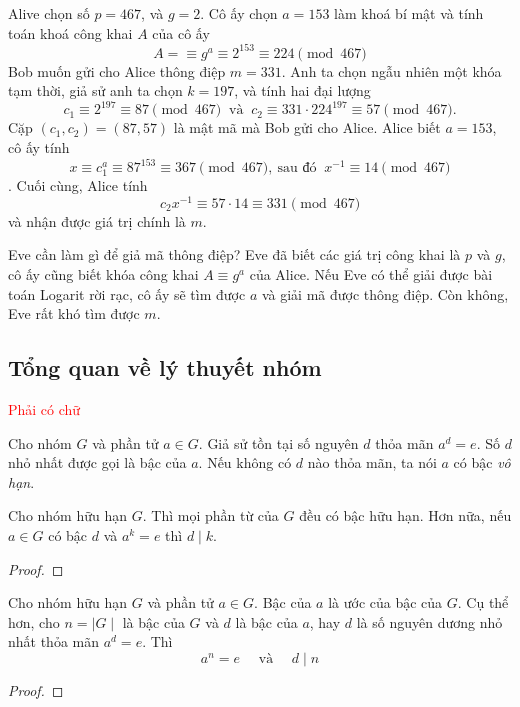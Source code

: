 \begin{example}
	Alive chọn số $p =467$, và $g = 2$. Cô ấy chọn $a = 153$ làm khoá bí mật và tính toán khoá công khai $A$ của cô ấy
	$$ A = \equiv g^a \equiv 2^{153} \equiv 224 \pmod{467}$$
	Bob muốn gửi cho Alice thông điệp $m = 331$. Anh ta chọn ngẫu nhiên một
	khóa tạm thời, giả sử anh ta chọn $k = 197$, và tính hai đại lượng
	$$ c_1 \equiv 2^{197} \equiv 87 \pmod{467} \ \text{ và } \ c_2 \equiv 331 \cdot 224^{197} \equiv 57 \pmod{467}.$$
	Cặp $(c_1, c_2) = (87, 57)$ là mật mã mà Bob gửi cho Alice.
	Alice biết $a = 153$, cô ấy tính
	$$ x \equiv c_1^a \equiv 87^{153} \equiv 367 \pmod{467}, \ \text{sau đó } \ x^{-1} \equiv 14 \pmod{467}$$.
	Cuối cùng, Alice tính
	$$c_2x^{-1} \equiv 57 \cdot 14 \equiv 331 \pmod{467}$$
	và nhận được giá trị chính là $m$.
\end{example}
Eve cần làm gì để giả mã thông điệp? Eve đã biết các giá trị công khai là $p$ và $g$, cô ấy cũng biết khóa công khai $A\equiv g^a$ của Alice.
Nếu Eve có thể giải được bài toán Logarit rời rạc, cô ấy sẽ tìm được $a$ và giải mã được thông điệp. Còn không, Eve rất khó tìm được $m$.

\subsection{Tổng quan về lý thuyết nhóm}
\textcolor{red}{Phải có chữ}
\begin{definition}
	Cho nhóm $G$ và phần tử $a \in G$. Giả sử tồn tại số nguyên $d$ thỏa mãn $a^d = e$. Số $d$ nhỏ nhất được gọi là bậc của $a$. Nếu không có $d$ nào thỏa mãn, ta nói $a$ có bậc \textit{vô hạn}.
\end{definition}
\begin{proposition}
	\label{pr:2.13}
	Cho nhóm hữu hạn $G$. Thì mọi phần từ của $G$ đều có bậc hữu hạn. Hơn nữa, nếu $a \in G$ có bậc $d$ và $a^k=e$ thì $d \mid k$.
\end{proposition}
\begin{proof}

\end{proof}

\begin{proposition}
	\label{pr:2.14}
	Cho nhóm hữu hạn $G$ và phần tử $a \in G$. Bậc của $a$ là ước của bậc của $G$.
	Cụ thể hơn, cho $n = \mid G \mid$ là bậc của $G$ và $d$ là bậc của $a$, hay $d$ là số nguyên dương nhỏ nhất thỏa mãn $a^d = e$. Thì
	$$ a^n =e \quad \text{ và } \quad d \mid n$$
\end{proposition}
\begin{proof}

\end{proof}

